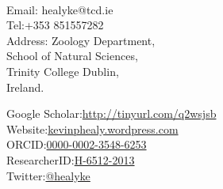 \documentclass[10pt,a4paper]{article}
\begin{document}
\par{\smallskip\par}

\large{}\\

\par{\normalsize{}\bigskip\par}


\begin{minipage}[t]{0.5\textwidth}
\raggedright

Email:  healyke@tcd.ie\\
Tel:\hspace{0mm}+353 851557282\\
Address: Zoology Department,\\
\hspace{0mm}School of Natural Sciences,\\
\hspace{0mm}Trinity College Dublin,\\ 
\hspace{0mm}Ireland.\\

\end{minipage}
\begin{minipage}[t]{0.45\textwidth}

Google Scholar:\href{http://scholar.google.com/citations?user=5Kb9u8EAAAAJ}{http://tinyurl.com/q2wsjsb}\\
Website:\href{http://kevinphealy.wordpress.com}{kevinphealy.wordpress.com}\\
ORCID:\href{http://orcid.org/0000-0002-3548-6253}{0000-0002-3548-6253}\\
ResearcherID:\href{http://www.researcherid.com/rid/H-6512-2013}{H-6512-2013}\\
Twitter:\href{https://twitter.com/healyke}{@healyke}\\
\end{minipage}

\bigskip

\end{document}

